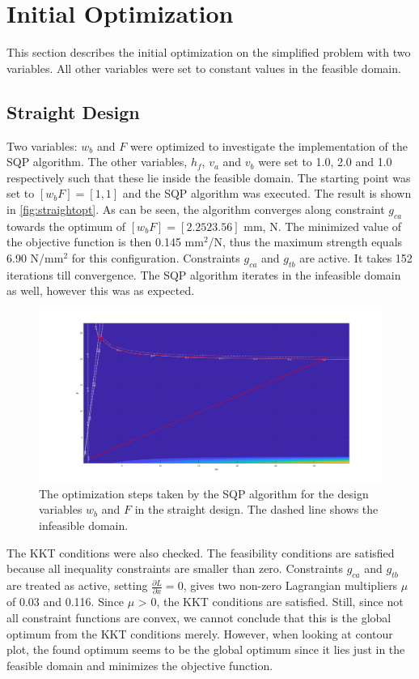 \section{Initial Optimization}
This section describes the initial optimization on the simplified problem with two variables. All other variables were set to constant values in the feasible domain. 
\subsection{Straight Design}
Two variables: $w_b$ and $F$ were optimized to investigate the implementation of the SQP algorithm. The other variables, $h_f$, $v_a$ and $v_b$ were set to 1.0, 2.0 and 1.0 respectively such that these lie inside the feasible domain. The starting point was set to $[w_b F] = [1, 1]$ and the SQP algorithm was executed. The result is shown in \autoref{fig:straightopt}. As can be seen, the algorithm converges along constraint $g_{ca}$ towards the optimum of $[w_b F] = [2.25 23.56]$ mm, N. The minimized value of the objective function is then 0.145 mm$^2$/N, thus the maximum strength equals 6.90 N/mm$^2$ for this configuration. Constraints $g_{ca}$ and $g_{tb}$ are active. It takes 152 iterations till convergence. The SQP algorithm iterates in the infeasible domain as well, however this was as expected.


\begin{figure}[H]
	\centering
	\includegraphics[width=\columnwidth]{sources/plots/straight2var.png}
	\caption{The optimization steps taken by the SQP algorithm for the design variables $w_b$ and $F$ in the straight design. The dashed line shows the infeasible domain.}
	\label{fig:straightopt}
\end{figure}


The KKT conditions were also checked. The feasibility conditions are satisfied because all inequality constraints are smaller than zero. Constraints $g_{ca}$ and $g_{tb}$ are treated as active, setting $\frac{\partial L}{\partial x} = 0$, gives two non-zero Lagrangian multipliers $\mu$ of 0.03 and 0.116. Since $\mu$ > 0, the KKT conditions are satisfied. Still, since not all constraint functions are convex, we cannot conclude that this is the global optimum from the KKT conditions merely. However, when looking at contour plot, the found optimum seems to be the global optimum since it lies just in the feasible domain and minimizes the objective function. 

